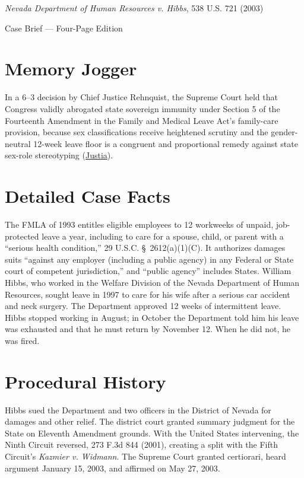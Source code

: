 \documentclass[12pt]{article}
\begin{document}
\begin{center}
{\LARGE \textit{Nevada Department of Human Resources v. Hibbs}, 538 U.S. 721 (2003)\par}
\vspace{0.8em}
{\large Case Brief --- Four-Page Edition\par}
\end{center}
\vspace{1em}

\section{Memory Jogger}

In a 6--3 decision by Chief Justice Rehnquist, the Supreme Court held that Congress validly abrogated state sovereign immunity under Section 5 of the Fourteenth Amendment in the Family and Medical Leave Act's family-care provision, because sex classifications receive heightened scrutiny and the gender-neutral 12-week leave floor is a congruent and proportional remedy against state sex-role stereotyping (\href{https://supreme.justia.com/cases/federal/us/538/721/}{Justia}).

\section{Detailed Case Facts}

The FMLA of 1993 entitles eligible employees to 12 workweeks of unpaid, job-protected leave a year, including to care for a spouse, child, or parent with a ``serious health condition,'' 29 U.S.C. \S~2612(a)(1)(C). It authorizes damages suits ``against any employer (including a public agency) in any Federal or State court of competent jurisdiction,'' and ``public agency'' includes States. William Hibbs, who worked in the Welfare Division of the Nevada Department of Human Resources, sought leave in 1997 to care for his wife after a serious car accident and neck surgery. The Department approved 12 weeks of intermittent leave. Hibbs stopped working in August; in October the Department told him his leave was exhausted and that he must return by November 12. When he did not, he was fired.

\section{Procedural History}

Hibbs sued the Department and two officers in the District of Nevada for damages and other relief. The district court granted summary judgment for the State on Eleventh Amendment grounds. With the United States intervening, the Ninth Circuit reversed, 273 F.3d 844 (2001), creating a split with the Fifth Circuit's \textit{Kazmier v. Widmann}. The Supreme Court granted certiorari, heard argument January 15, 2003, and affirmed on May 27, 2003.
\end{document}
